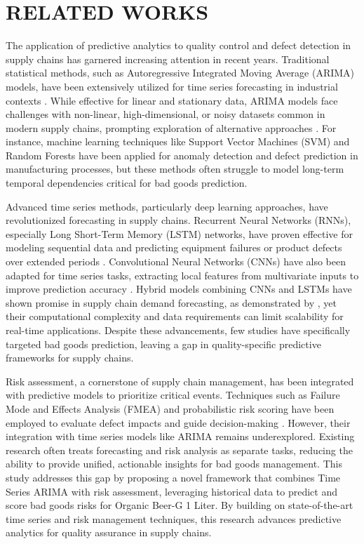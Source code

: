 \section{RELATED WORKS}
\label{sec:relatedwork}
The application of predictive analytics to quality control and defect detection in supply chains has garnered increasing attention in recent years. Traditional statistical methods, such as Autoregressive Integrated Moving Average (ARIMA) models, have been extensively utilized for time series forecasting in industrial contexts \cite{box2015time}. While effective for linear and stationary data, ARIMA models face challenges with non-linear, high-dimensional, or noisy datasets common in modern supply chains, prompting exploration of alternative approaches \cite{li2020hybrid}. For instance, machine learning techniques like Support Vector Machines (SVM) and Random Forests have been applied for anomaly detection and defect prediction in manufacturing processes, but these methods often struggle to model long-term temporal dependencies critical for bad goods prediction.

Advanced time series methods, particularly deep learning approaches, have revolutionized forecasting in supply chains. Recurrent Neural Networks (RNNs), especially Long Short-Term Memory (LSTM) networks, have proven effective for modeling sequential data and predicting equipment failures or product defects over extended periods \cite{malhotra2015long}. Convolutional Neural Networks (CNNs) have also been adapted for time series tasks, extracting local features from multivariate inputs to improve prediction accuracy \cite{bai2018empirical}. Hybrid models combining CNNs and LSTMs have shown promise in supply chain demand forecasting, as demonstrated by \cite{li2020hybrid}, yet their computational complexity and data requirements can limit scalability for real-time applications. Despite these advancements, few studies have specifically targeted bad goods prediction, leaving a gap in quality-specific predictive frameworks for supply chains.

Risk assessment, a cornerstone of supply chain management, has been integrated with predictive models to prioritize critical events. Techniques such as Failure Mode and Effects Analysis (FMEA) and probabilistic risk scoring have been employed to evaluate defect impacts and guide decision-making \cite{stamatis2003failure}. However, their integration with time series models like ARIMA remains underexplored. Existing research often treats forecasting and risk analysis as separate tasks, reducing the ability to provide unified, actionable insights for bad goods management. This study addresses this gap by proposing a novel framework that combines Time Series ARIMA with risk assessment, leveraging historical data to predict and score bad goods risks for Organic Beer-G 1 Liter. By building on state-of-the-art time series and risk management techniques, this research advances predictive analytics for quality assurance in supply chains.
